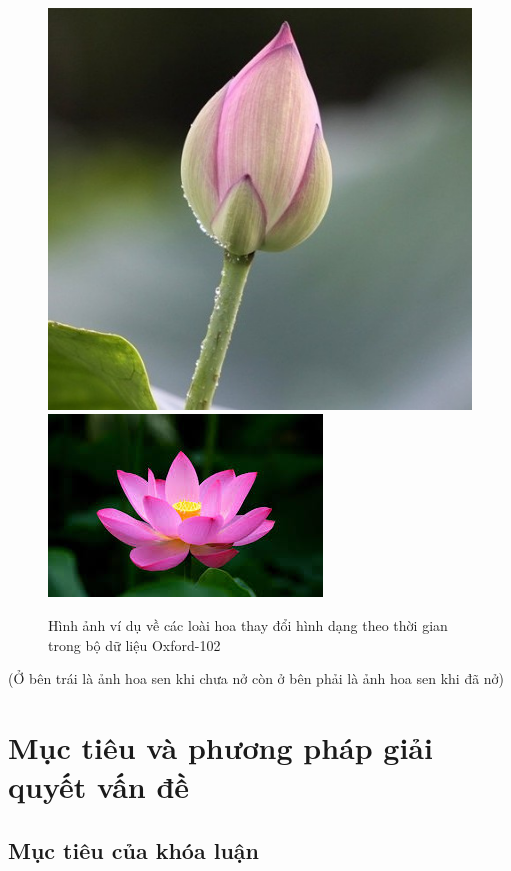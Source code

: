 \documentclass[12pt]{report}
\begin{document}
		\begin{figure}[h]
			\centering
			\includegraphics[scale=0.35]{anh_5}
			\includegraphics[scale=0.88]{anh_6}
			\caption{Hình ảnh ví dụ về các loài hoa thay đổi hình dạng theo thời gian trong bộ dữ liệu Oxford-102 }
			\label{fig:anh_hoa_khacnhau_thoigian}
		\end{figure}
		(Ở bên trái là ảnh hoa sen khi chưa nở còn ở bên phải là ảnh hoa sen khi đã nở)
																																																																										
		\section{Mục tiêu và phương pháp giải quyết vấn đề}
		\subsection{Mục tiêu của khóa luận}
																																																																								
\end{document}

